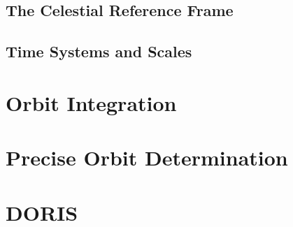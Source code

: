 \documentclass[12pt,a4paper,twoside]{report}
\begin{document}
    \section{The Celestial Reference Frame}
      
      
      
      
    
    \section{Time Systems and Scales}
      
      
\fi

\chapter{Orbit Integration}\label{ch:orbit-integration}
\iffalse
  
  
  
  
\fi

\chapter{Precise Orbit Determination}\label{ch:pod}
\iffalse
  
    
  
    
    
  
  
  
  
\fi

\chapter{DORIS}\label{ch:doris}
  
  
  
  
  

\iffalse
  
  
  
  
  
  
  
  
  
  
  
  
  
\fi
\end{document}

